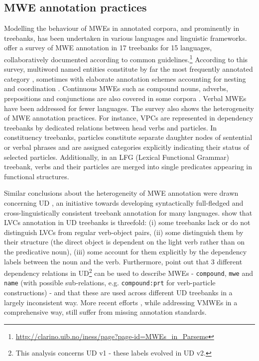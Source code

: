 \documentclass[output=paper,modfonts]{langscibook}
\begin{document}
\subsection{MWE annotation practices}
\label{sec:related-practices}

Modelling the behaviour of MWEs in annotated corpora, and prominently in treebanks, has been undertaken in various languages and linguistic frameworks. \citet{rosen:hal-01226001} offer a survey of MWE annotation in 17 treebanks for 15 languages, collaboratively documented according to common guidelines.\footnote{{\scriptsize \url{http://clarino.uib.no/iness/page?page-id=MWEs_in_Parseme}}}  
According to this survey, multiword named entities constitute by far the most frequently annotated category \citep{erjavec2010jos}, sometimes with elaborate annotation schemes accounting for nesting and coordination \citep{savaryetal10}. Continuous MWEs such as compound nouns, adverbs, prepositions and conjunctions are also covered in some corpora \citep{abeille:2003:ftb,Laporteetal08a,branco2010}. Verbal MWEs 
have been addressed for fewer languages. The survey also shows the heterogeneity of MWE annotation practices. For instance, VPCs %
are represented in dependency treebanks by dedicated relations between head verbs and particles. In constituency treebanks, particles constitute separate daughter nodes of sentential or verbal phrases and are assigned categories explicitly indicating their status of selected particles. Additionally, in an LFG (Lexical Functional Grammar) treebank, verbs and their particles are merged into single predicates appearing in functional structures.


Similar conclusions about the heterogeneity of MWE annotation were drawn concerning UD \citep{mcdonald-EtAl:2013:Short}, an initiative towards developing syntactically full-fledged and cross-linguistically consistent treebank annotation for many languages. 
\citet{NivreVincze15} show that LVCs annotation in UD treebanks is threefold: (i) some treebanks lack or do not distinguish LVCs from regular verb-object pairs, (ii) some distinguish them by their structure (the direct object is dependent on the light verb rather than on the predicative noun), (iii) some account for them explicitly by the dependency labels between the noun and the verb. Furthermore, \citet{DeSmedtetal15} point out that 3 different dependency relations in UD\footnote{This analysis concerns UD v1 - these labels evolved in UD v2.} can be used to describe MWEs - \texttt{compound}, \texttt{mwe} and \texttt{name} (with possible sub-relations, e.g. \texttt{compound:prt} for verb-particle constructions) 
- and that these are used across different UD treebanks in a largely inconsistent way.  
More recent efforts \citep{ciclingkubra}, while addressing VMWEs in a comprehensive way, still suffer from missing annotation standards.
\end{document}

